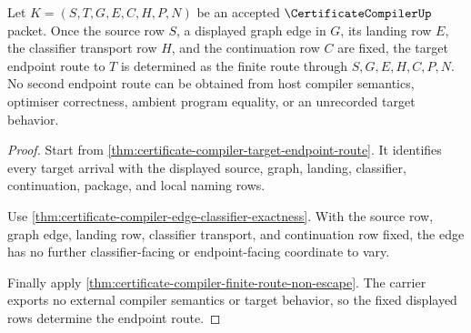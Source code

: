 \begin{theorem}
\label{thm:certificate-compiler-target-endpoint-determinacy}
Let $K=(S,T,G,E,C,H,P,N)$ be an accepted $\CertificateCompilerUp$ packet. Once
the source row $S$, a displayed graph edge in $G$, its landing row $E$, the
classifier transport row $H$, and the continuation row $C$ are fixed, the
target endpoint route to $T$ is determined as the finite route through
$S,G,E,H,C,P,N$. No second endpoint route can be obtained from host compiler
semantics, optimiser correctness, ambient program equality, or an unrecorded
target behavior.
\end{theorem}
\begin{proof}
Start from \autoref{thm:certificate-compiler-target-endpoint-route}. It
identifies every target arrival with the displayed source, graph, landing,
classifier, continuation, package, and local naming rows.

Use \autoref{thm:certificate-compiler-edge-classifier-exactness}. With the
source row, graph edge, landing row, classifier transport, and continuation
row fixed, the edge has no further classifier-facing or endpoint-facing
coordinate to vary.

Finally apply \autoref{thm:certificate-compiler-finite-route-non-escape}. The
carrier exports no external compiler semantics or target behavior, so the
fixed displayed rows determine the endpoint route.
\end{proof}

